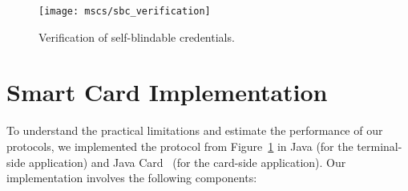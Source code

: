 \begin{figure}[ht]
  \centering
  \texttt{[image: mscs/sbc\_verification]}
  \caption{Verification of self-blindable credentials.}
  \label{fig:SBC-verification}
\end{figure}

\section{Smart Card Implementation}\label{sec:sbc-implementation}

To understand the practical limitations and estimate the performance of our
protocols, we implemented the protocol from Figure~\ref{fig:SBC-verification}
in Java (for the terminal-side application) and Java Card~\cite{Chen00} (for the
card-side application). Our implementation involves the following components:
